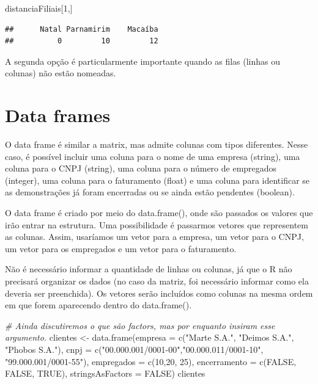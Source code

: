 \documentclass[
]{book}
\newenvironment{Shaded}{\begin{snugshade}}{\end{snugshade}}
\newcommand{\AttributeTok}[1]{\textcolor[rgb]{0.77,0.63,0.00}{#1}}
\newcommand{\CommentTok}[1]{\textcolor[rgb]{0.56,0.35,0.01}{\textit{#1}}}
\newcommand{\ConstantTok}[1]{\textcolor[rgb]{0.00,0.00,0.00}{#1}}
\newcommand{\DecValTok}[1]{\textcolor[rgb]{0.00,0.00,0.81}{#1}}
\newcommand{\FunctionTok}[1]{\textcolor[rgb]{0.00,0.00,0.00}{#1}}
\newcommand{\NormalTok}[1]{#1}
\newcommand{\OtherTok}[1]{\textcolor[rgb]{0.56,0.35,0.01}{#1}}
\newcommand{\StringTok}[1]{\textcolor[rgb]{0.31,0.60,0.02}{#1}}
\begin{document}
\begin{Shaded}
\begin{Highlighting}[]
\NormalTok{distanciaFiliais[}\DecValTok{1}\NormalTok{,]}
\end{Highlighting}
\end{Shaded}

\begin{verbatim}
##      Natal Parnamirim    Macaíba 
##          0         10         12
\end{verbatim}

A segunda opção é particularmente importante quando as filas (linhas ou colunas) não estão nomeadas.

\hypertarget{data-frames}{%
\section{Data frames}\label{data-frames}}

O data frame é similar a matrix, mas admite colunas com tipos diferentes. Nesse caso, é possível incluir uma coluna para o nome de uma empresa (string), uma coluna para o CNPJ (string), uma coluna para o número de empregados (integer), uma coluna para o faturamento (float) e uma coluna para identificar se as demonstrações já foram encerradas ou se ainda estão pendentes (boolean).

O data frame é criado por meio do data.frame(), onde são passados os valores que irão entrar na estrutura. Uma possibilidade é passarmos vetores que representem as colunas. Assim, usaríamos um vetor para a empresa, um vetor para o CNPJ, um vetor para os empregados e um vetor para o faturamento.

Não é necessário informar a quantidade de linhas ou colunas, já que o R não precisará organizar os dados (no caso da matriz, foi necessário informar como ela deveria ser preenchida). Os vetores serão incluídos como colunas na mesma ordem em que forem aparecendo dentro do data.frame().

\begin{Shaded}
\begin{Highlighting}[]
\CommentTok{\# Ainda discutiremos o que são factors, mas por enquanto insiram esse argumento.}
\NormalTok{clientes }\OtherTok{\textless{}{-}} \FunctionTok{data.frame}\NormalTok{(}\AttributeTok{empresa =} \FunctionTok{c}\NormalTok{(}\StringTok{"Marte S.A."}\NormalTok{, }\StringTok{"Deimos S.A."}\NormalTok{, }\StringTok{"Phobos S.A."}\NormalTok{), }
                       \AttributeTok{cnpj =} \FunctionTok{c}\NormalTok{(}\StringTok{"00.000.001/0001{-}00"}\NormalTok{,}\StringTok{"00.000.011/0001{-}10"}\NormalTok{, }\StringTok{"99.000.001/0001{-}55"}\NormalTok{),}
                       \AttributeTok{empregados =} \FunctionTok{c}\NormalTok{(}\DecValTok{10}\NormalTok{,}\DecValTok{20}\NormalTok{, }\DecValTok{25}\NormalTok{), }
                       \AttributeTok{encerramento =} \FunctionTok{c}\NormalTok{(}\ConstantTok{FALSE}\NormalTok{, }\ConstantTok{FALSE}\NormalTok{, }\ConstantTok{TRUE}\NormalTok{),}
                       \AttributeTok{stringsAsFactors =} \ConstantTok{FALSE}\NormalTok{)}
\NormalTok{clientes}
\end{Highlighting}
\end{Shaded}
\end{document}

